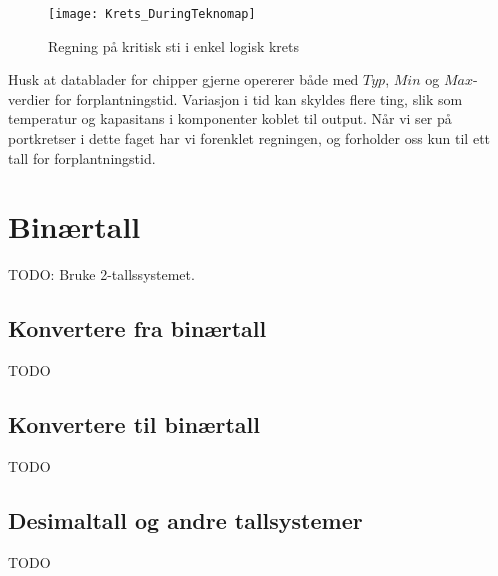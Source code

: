 \documentclass[12pt,a4paper,norsk]{article}
\begin{document}
\begin{figure}[hbt!]
  \centering
  \texttt{[image: Krets\_DuringTeknomap]}
  \caption{Regning på kritisk sti i enkel logisk krets\label{fig:kritisk_sti}}
\end{figure}

Husk at datablader for chipper gjerne opererer både med $Typ$, $Min$ og
$Max$-verdier for forplantningstid. Variasjon i tid kan skyldes flere ting, slik
som temperatur og kapasitans i komponenter koblet til output. Når vi ser på
portkretser i dette faget har vi forenklet regningen, og forholder oss kun til
ett tall for forplantningstid.

\section{Binærtall}
TODO\@: Bruke 2-tallssystemet.

\subsection{Konvertere fra binærtall}
TODO

\subsection{Konvertere til binærtall}
TODO

\subsection{Desimaltall og andre tallsystemer}
TODO
\end{document}
